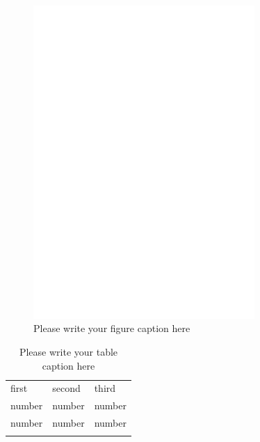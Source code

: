 %
\begin{figure}
  \includegraphics[width=0.75\textwidth]{bfeed_mob}
\caption{Please write your figure caption here}
\label{fig:2}       %
\end{figure}
%
\begin{table}
\caption{Please write your table caption here}
\label{tab:1}       %
\begin{tabular}{lll}
\hline\noalign{\smallskip}
first & second & third  \\
\noalign{\smallskip}\hline\noalign{\smallskip}
number & number & number \\
number & number & number \\
\noalign{\smallskip}\hline
\end{tabular}
\end{table}




